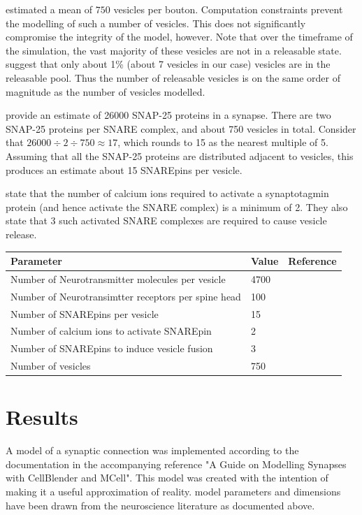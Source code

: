 \documentclass[a4paper]{article}
\begin{document}
\cite{Rollehagen::2015} estimated a mean of $750$ vesicles per bouton. Computation constraints prevent the modelling of such a number of vesicles. This does not significantly compromise the integrity of the model, however. Note that over the timeframe of the simulation, the vast majority of these vesicles are not in a releasable state. \cite{rizzoli2005synaptic} suggest that only about 1\% (about 7 vesicles in our case) vesicles are in the releasable pool. Thus the number of releasable vesicles is on the same order of magnitude as the number of vesicles modelled.

\cite{Wilhelm:Science:2014} provide an estimate of 26000 SNAP-25 proteins in a synapse. There are two SNAP-25 proteins per SNARE complex, and about 750 vesicles in total. Consider that $26000 \div 2 \div 750 \approx 17$, which rounds to 15 as the nearest multiple of 5. Assuming that all the SNAP-25 proteins are distributed adjacent to vesicles, this produces an estimate about 15 SNAREpins per vesicle.

\cite{Dittrich:BiophysJ:2013} state that the number of calcium ions required to activate a synaptotagmin protein (and hence activate the SNARE complex) is a minimum of 2. They also state that 3 such activated SNARE complexes are required to cause vesicle release. 

\begin{table}[H]
\begin{tabular}{lll}
Parameter & Value & Reference \\ \hline
Number of Neurotransmitter molecules per vesicle & 4700&\cite{Bruns:Nature:1995} \\
Number of Neurotransimtter receptors per spine head & 100 & \cite{Stricker:JPhysiol:1996} \\
Number of SNAREpins per vesicle & 15 & \cite{Wilhelm:Science:2014} \\ 
Number of calcium ions to activate SNAREpin& 2 & \cite{Dittrich:BiophysJ:2013} \\
Number of SNAREpins to induce vesicle fusion & 3 & \cite{Dittrich:BiophysJ:2013} \\  
Number of vesicles & 750 & \cite{Rollehagen::2015}\\
\end{tabular}
\end{table}

\section{Results}
A model of a synaptic connection was implemented according to the documentation in the accompanying reference "A Guide on Modelling Synapses with CellBlender and MCell". This model was created with the intention of making it a useful approximation of reality. model parameters and dimensions have been drawn from the neuroscience literature as documented above.
\end{document}
